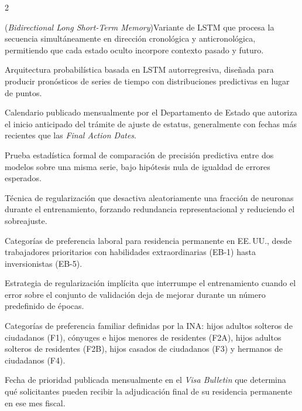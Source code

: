 \documentclass[12pt,letterpaper]{report}
\begin{document}
\begin{multicols}{2}
\begin{description}[leftmargin=0pt, labelindent=0pt, itemindent=0pt,
                    labelsep=0.4em, font=\bfseries\scriptsize,
                    itemsep=2pt, parsep=0pt, topsep=0pt]
    \item[BiLSTM] (\textit{Bidirectional Long Short-Term Memory})\hspace{0.3em}Variante de LSTM que procesa la secuencia simultáneamente en dirección cronológica y anticronológica, permitiendo que cada estado oculto incorpore contexto pasado y futuro.

    \item[DeepAR] Arquitectura probabilística basada en LSTM autorregresiva, diseñada para producir pronósticos de series de tiempo con distribuciones predictivas en lugar de puntos.

    \item[Dates for Filing] Calendario publicado mensualmente por el Departamento de Estado que autoriza el inicio anticipado del trámite de ajuste de estatus, generalmente con fechas más recientes que las \textit{Final Action Dates}.

    \item[Diebold-Mariano (prueba)] Prueba estadística formal de comparación de precisión predictiva entre dos modelos sobre una misma serie, bajo hipótesis nula de igualdad de errores esperados.

    \item[Dropout] Técnica de regularización que desactiva aleatoriamente una fracción de neuronas durante el entrenamiento, forzando redundancia representacional y reduciendo el sobreajuste.

    \item[EB-1 a EB-5] Categorías de preferencia laboral para residencia permanente en EE.\,UU., desde trabajadores prioritarios con habilidades extraordinarias (EB-1) hasta inversionistas (EB-5).

    \item[Early Stopping] Estrategia de regularización implícita que interrumpe el entrenamiento cuando el error sobre el conjunto de validación deja de mejorar durante un número predefinido de épocas.

    \item[F1, F2A, F2B, F3, F4] Categorías de preferencia familiar definidas por la INA: hijos adultos solteros de ciudadanos (F1), cónyuges e hijos menores de residentes (F2A), hijos adultos solteros de residentes (F2B), hijos casados de ciudadanos (F3) y hermanos de ciudadanos (F4).

    \item[Final Action Dates] Fecha de prioridad publicada mensualmente en el \textit{Visa Bulletin} que determina qué solicitantes pueden recibir la adjudicación final de su residencia permanente en ese mes fiscal.


\end{description}
\end{multicols}
\end{document}
